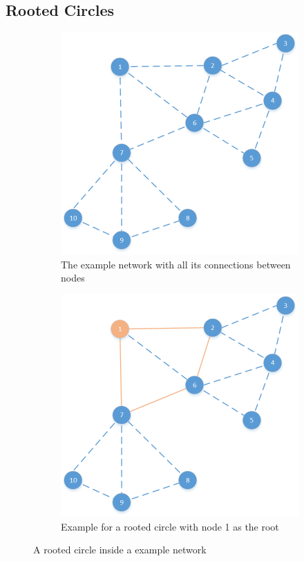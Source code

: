\subsection{Rooted Circles}
\begin{figure}[htbp]
	\centering
	\begin{subfigure}[t]{0.4\textwidth}
		\centering
    		\includegraphics[scale=0.6]{content/images/Schedule/Network}
   	 	\caption{The example network with all its connections between nodes}
    	\label{fig:density}
    \end{subfigure}
    \quad
    \quad
    \begin{subfigure}[t]{0.4\textwidth}
		\centering         
        \includegraphics[scale=0.6]{content/images/Schedule/RootedCircle}
        \caption{Example for a rooted circle with node 1 as the root}
        \label{fig:link}
    \end{subfigure}
    \caption{A rooted circle inside a example network}
\end{figure}

